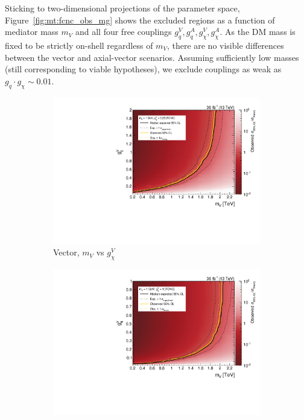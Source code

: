Sticking to two-dimensional projections of the parameter space, Figure~\ref{fig:mt:fcnc_obs_mg} shows the excluded regions as a function of mediator mass $m_V$ and all four free couplings $g_q^V,g_q^A,g_\chi^V,g_\chi^A$. 
As the DM mass is fixed to be strictly on-shell regardless of $m_V$, there are no visible differences between the vector and axial-vector scenarios. 
Assuming sufficiently low masses (still corresponding to viable hypotheses), we exclude couplings as weak as $g_q \cdot g_\chi \sim 0.01$.  

\begin{figure}[]
    \begin{center}
        \begin{subfigure}[t]{0.49\textwidth}
            \includegraphics[width=\textwidth]{figures/monotop/results/fcnc2d_obs_gdmv_mV.pdf}
            \caption{Vector, $m_V$ vs $g_\chi^V$}
        \end{subfigure}
        \begin{subfigure}[t]{0.49\textwidth}
            \includegraphics[width=\textwidth]{figures/monotop/results/fcnc2d_obs_gqv_mV.pdf}

\end{subfigure}
\end{center}
\end{figure}
